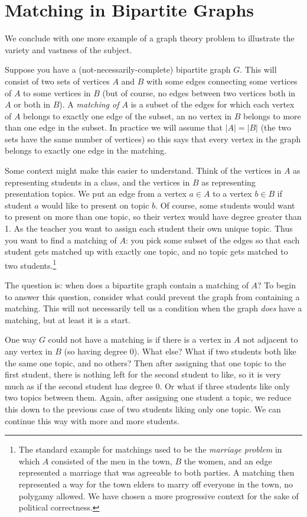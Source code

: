\documentclass[12pt]{article}
\begin{document}
\section{Matching in Bipartite Graphs}

We conclude with one more example of a graph theory problem to illustrate the variety and vastness of the subject.

Suppose you have a (not-necessarily-complete) bipartite graph $G$.  This will consist of two sets of vertices $A$ and $B$ with some edges connecting some vertices of $A$ to some vertices in $B$ (but of course, no edges between two vertices both in $A$ or both in $B$).  A {\em matching of $A$} is a subset of the edges for which each vertex of $A$ belongs to exactly one edge of the subset, an no vertex in $B$ belongs to more than one edge in the subset.  In practice we will assume that $|A| = |B|$ (the two sets have the same number of vertices) so this says that every vertex in the graph belongs to exactly one edge in the matching.  

Some context might make this easier to understand.  Think of the vertices in $A$ as representing students in a class, and the vertices in $B$ as representing presentation topics.  We put an edge from a vertex  $a \in A$ to a vertex $b \in B$ if student $a$ would like to present on topic $b$.  Of course, some students would want to present on more than one topic, so their vertex would have degree greater than 1.  As the teacher you want to assign each student their own unique topic.  Thus you want to find a matching of $A$: you pick some subset of the edges so that each student gets matched up with exactly one topic, and no topic gets matched to two students.\footnote{The standard example for matchings used to be the {\em marriage problem} in which $A$ consisted of the men in the town, $B$ the women, and an edge represented a marriage that was agreeable to both parties.  A matching then represented a way for the town elders to marry off everyone in the town, no polygamy allowed.  We have chosen a more progressive context for the sake of political correctness.}

The question is: when does a bipartite graph contain a matching of $A$?  To begin to answer this question, consider what could prevent the graph from containing a matching.  This will not necessarily tell us a condition when the graph {\em does} have a matching, but at least it is a start.

One way $G$ could not have a matching is if there is a vertex in $A$ not adjacent to any vertex in $B$ (so having degree 0).  What else?  What if two students both like the same one topic, and no others?  Then after assigning that one topic to the first student, there is nothing left for the second student to like, so it is very much as if the second student has degree 0.  Or what if three students like only two topics between them.  Again, after assigning one student a topic, we reduce this down to the previous case of two students liking only one topic.  We can continue this way with more and more students.
\end{document}
